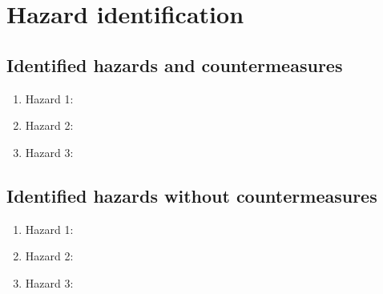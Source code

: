 \section{Hazard identification}
\label{chapter4}

\subsection{Identified hazards and countermeasures}


	\begin{enumerate}
		\item Hazard 1: 
		\item Hazard 2:
		\item Hazard 3:
	\end{enumerate}
	
\subsection{Identified hazards without countermeasures }

	\begin{enumerate}
		\item Hazard 1: 
		\item Hazard 2:
		\item Hazard 3:
	\end{enumerate}